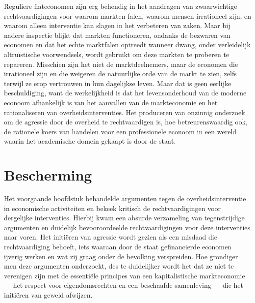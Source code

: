 \documentclass[
  a5paper,
  smalldemyvopaper,11pt,twoside,onecolumn,openright,extrafontsizes,
hidelinks]{memoir}
\begin{document}
Reguliere fiateconomen zijn erg behendig in het aandragen van
zwaarwichtige rechtvaardigingen voor waarom markten falen, waarom mensen
irrationeel zijn, en waarom alleen interventie kan slagen in het
verbeteren van zaken. Maar bij nadere inspectie blijkt dat markten
functioneren, ondanks de bezwaren van economen en dat het echte
marktfalen optreedt wanneer dwang, onder verleidelijk altruïstische
voorwendsels, wordt gebruikt om deze markten te proberen te repareren.
Misschien zijn het niet de marktdeelnemers, maar de economen die
irrationeel zijn en die weigeren de natuurlijke orde van de markt te
zien, zelfs terwijl ze erop vertrouwen in hun dagelijkse leven. Maar dat
is geen eerlijke beschuldiging, want de werkelijkheid is dat het
levensonderhoud van de moderne econoom afhankelijk is van het aanvallen
van de markteconomie en het rationaliseren van overheidsinterventies.
Het produceren van onzinnig onderzoek om de agressie door de overheid te
rechtvaardigen is, hoe betreurenswaardig ook, de rationele koers van
handelen voor een professionele econoom in een wereld waarin het
academische domein gekaapt is door de staat.

\chapter{Bescherming}\label{sec-bescherming}

Het voorgaande hoofdstuk behandelde argumenten tegen de
overheidsinterventie in economische activiteiten en bekeek kritisch de
rechtvaardigingen voor dergelijke interventies. Hierbij kwam een absurde
verzameling van tegenstrijdige argumenten en duidelijk bevooroordeelde
rechtvaardigingen voor deze interventies naar voren. Het initiëren van
agressie wordt gezien als een misdaad die rechtvaardiging behoeft, iets
waaraan door de staat gefinancierde economen ijverig werken en wat zij
graag onder de bevolking verspreiden. Hoe grondiger men deze argumenten
onderzoekt, des te duidelijker wordt het dat ze niet te verenigen zijn
met de essentiële principes van een kapitalistische markteconomie ---
het respect voor eigendomsrechten en een beschaafde samenleving --- die
het initiëren van geweld afwijzen.
\end{document}
